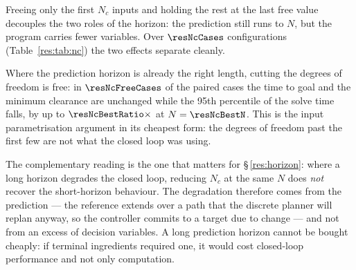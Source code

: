 \label{res:nc}


Freeing only the first $N_c$ inputs and holding the rest at the last free value decouples the two roles of the horizon: the prediction still runs to $N$, but the program carries fewer variables. Over $\resNcCases$ configurations (Table~\ref{res:tab:nc}) the two effects separate cleanly.

Where the prediction horizon is already the right length, cutting the degrees of freedom is free: in $\resNcFreeCases$ of the paired cases the time to goal and the minimum clearance are unchanged while the 95th percentile of the solve time falls, by up to $\resNcBestRatio\times$ at $N=\resNcBestN$. This is the input parametrisation argument in its cheapest form: the degrees of freedom past the first few are not what the closed loop was using.

The complementary reading is the one that matters for \S\,\ref{res:horizon}: where a long horizon degrades the closed loop, reducing $N_c$ at the same $N$ does \emph{not} recover the short-horizon behaviour. The degradation therefore comes from the prediction --- the reference extends over a path that the discrete planner will replan anyway, so the controller commits to a target due to change --- and not from an excess of decision variables. A long prediction horizon cannot be bought cheaply: if terminal ingredients required one, it would cost closed-loop performance and not only computation.



